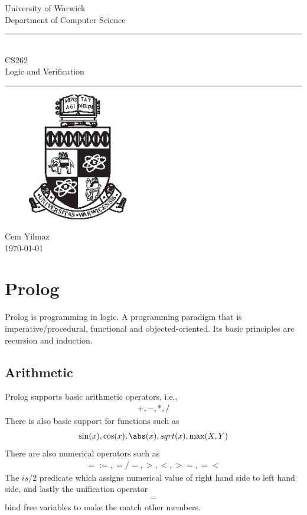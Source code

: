 \documentclass[a4paper]{article}
\theoremstyle{plain}
\theoremstyle{definition}
\theoremstyle{remark}
\begin{document}
	\begin{titlepage}
	\begin{center}
	\large
	University of Warwick \\
	Department of Computer Science \\
	\huge
	\vspace{50mm}
	\rule{\linewidth}{0.5pt} \\
	CS262 \\
	\vspace{5mm}
	\Large
	Logic and Verification
	\rule{\linewidth}{0.5pt}
	\vspace{5mm}
	\begin{figure}[H]
	\centering
	\includegraphics[width=0.4\textwidth]{crest_black.eps}
	\end{figure}
	\vspace{37mm}
	Cem Yilmaz \\
	\today
	\end{center}
	\end{titlepage}
	\newpage
	\tableofcontents
	\newpage
	\section{Prolog}
	Prolog is programming in logic. A programming paradigm that is imperative/procedural, functional and objected-oriented. Its basic principles are recursion and induction.
\subsection{Arithmetic}
	Prolog supports basic arithmetic operators, i.e.,
	\begin{align}
		+,-,*,/
	\end{align}
	There is also basic support for functions such as
	\begin{align}
		\sin(x), \cos(x), \abs(x), sqrt(x), \max(X,Y)
	\end{align}
	There are also numerical operators such as
	\begin{align}
		=:=, =/=, >, <, >=, =<
	\end{align}
	The $is/2$ predicate which assigns numerical value of right hand side to left hand side, and lastly the unification operator
	\begin{align}
		=
	\end{align}
	bind free variables to make the match other members.
\end{document}
